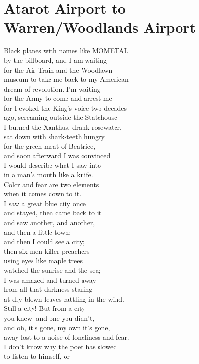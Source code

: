 \documentclass[smalldemyvopaper,11pt,twoside,onecolumn,openright,extrafontsizes]{memoir}
\begin{document}
\chapter{Atarot Airport to Warren/Woodlands Airport}
Black planes with names like MOMETAL
\\by the billboard, and I am waiting
\\for the Air Train and the Woodlawn
\\museum to take me back to my American
\\dream of revolution. I'm waiting
\\for the Army to come and arrest me
\\for I evoked the King's voice two decades
\\ago, screaming outside the Statehouse
\\I burned the Xanthus, drank rosewater,
\\sat down with shark-teeth hungry
\\for the green meat of Beatrice,
\\and soon afterward I was convinced
\\I would describe what I saw into
\\in a man's mouth like a knife.
\\Color and fear are two elements
\\when it comes down to it.
\\I saw a great blue city once
\\and stayed, then came back to it
\\and saw another, and another,
\\and then a little town;
\\and then I could see a city;
\\then six men killer-preachers
\\using eyes like maple trees
\\watched the sunrise and the sea;
\\I was amazed and turned away
\\from all that darkness staring
\\at dry blown leaves rattling in the wind.
\\Still a city! But from a city
\\you knew, and one you didn't,
\\and oh, it's gone, my own it's gone,
\\away lost to a noise of loneliness and fear.
\\I don't know why the poet has slowed
\\to listen to himself, or
\end{document}
